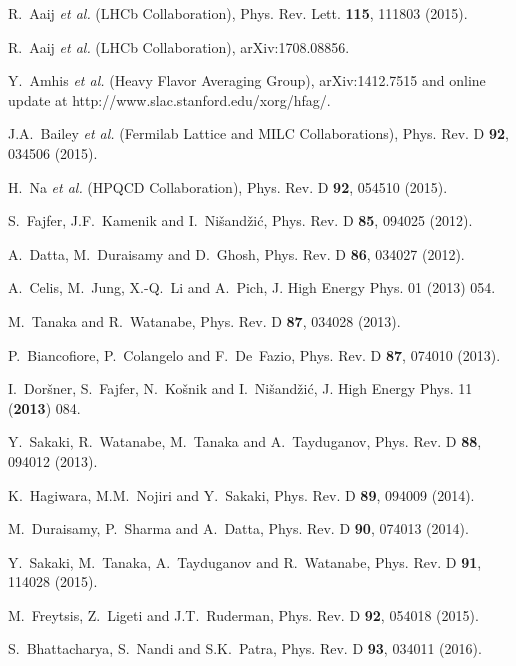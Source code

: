 \documentclass[aps,prd,twocolumn,superscriptaddress,showpacs,preprintnumbers,amsmath,amssymb]{revtex4-1}
\begin{document}
\begin{thebibliography}{99}
  R.~Aaij {\it et al.} (LHCb Collaboration),
  Phys. Rev. Lett. {\bf 115}, 111803 (2015).

  R.~Aaij {\it et al.} (LHCb Collaboration),
  arXiv:1708.08856.
    
  Y.~Amhis {\it et al.} (Heavy Flavor Averaging Group),
  arXiv:1412.7515 and online update at http://www.slac.stanford.edu/xorg/hfag/.
    
  J.A.~Bailey {\it et al.} (Fermilab Lattice and MILC Collaborations),
  Phys. Rev. D {\bf 92}, 034506 (2015).

  H.~Na {\it et al.} (HPQCD Collaboration),
  Phys. Rev. D {\bf 92}, 054510 (2015).

  S.~Fajfer, J.F.~Kamenik and I.~Ni\v{s}and\v{z}i\'c,
  Phys. Rev. D {\bf 85}, 094025 (2012).

  A.~Datta, M.~Duraisamy and D.~Ghosh,
  Phys. Rev. D {\bf 86}, 034027 (2012).

  A.~Celis, M.~Jung, X.-Q.~Li and A.~Pich,
  J. High Energy Phys. 01 (2013) 054.
  
  M.~Tanaka and R.~Watanabe,
  Phys. Rev. D {\bf 87}, 034028 (2013).

  P.~Biancofiore, P.~Colangelo and F.~De~Fazio,
  Phys. Rev. D {\bf 87}, 074010 (2013).

  I.~Dor\v{s}ner, S.~Fajfer, N.~Ko\v{s}nik and I.~Ni\v{s}and\v{z}i\'{c},
  J. High Energy Phys. 11 ({\bf 2013}) 084.
  
  Y.~Sakaki, R.~Watanabe, M.~Tanaka and A.~Tayduganov,
  Phys. Rev. D {\bf 88}, 094012 (2013).

  K.~Hagiwara, M.M.~Nojiri and Y.~Sakaki,
  Phys. Rev. D {\bf 89}, 094009 (2014).

  M.~Duraisamy, P.~Sharma and A.~Datta,
  Phys. Rev. D {\bf 90}, 074013 (2014).

  Y.~Sakaki, M.~Tanaka, A.~Tayduganov and R.~Watanabe,
  Phys. Rev. D {\bf 91}, 114028 (2015).

  M.~Freytsis, Z.~Ligeti and J.T.~Ruderman,
  Phys. Rev. D {\bf 92}, 054018 (2015).

  S.~Bhattacharya, S.~Nandi and S.K.~Patra,
  Phys. Rev. D {\bf 93}, 034011 (2016).


\end{thebibliography}
\end{document}
